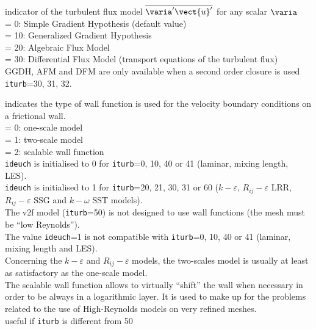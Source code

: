 {indicator of the turbulent flux model $ \overline{\varia^\prime \vect{u}^\prime}$
for any scalar $\varia$\\
\hspace*{1.3cm}= 0: Simple Gradient Hypothesis (default value)\\
\hspace*{1.3cm}= 10: Generalized Gradient Hypothesis\\
\hspace*{1.3cm}= 20: Algebraic Flux Model\\
\hspace*{1.3cm}= 30: Differential Flux Model (transport equations of the turbulent flux)\\
GGDH, AFM and DFM are only available when a second order closure is used {\tt iturb}=30, 31, 32.
}

{indicates the type of wall function is used for
 the velocity boundary conditions on a frictional wall.\\
\hspace*{1.3cm}= 0: one-scale model\\
\hspace*{1.3cm}= 1: two-scale model\\
\hspace*{1.3cm}= 2: scalable wall function\\
{\tt ideuch} is initialised to 0 for {\tt iturb}=0, 10, 40 or 41
(laminar, mixing length, LES).\\
{\tt ideuch} is initialised to 1 for {\tt iturb}=20, 21, 30, 31 or 60
($k-\varepsilon$, $R_{ij}-\varepsilon$ LRR, $R_{ij}-\varepsilon$ SSG and
$k-\omega$ SST models).\\
The v2f model ({\tt iturb}=50) is not designed to use wall functions
(the mesh must be ``low Reynolds'').\\
The value {\tt ideuch}=1 is not compatible with {\tt iturb}=0, 10, 40
or 41 (laminar, mixing length and LES).\\
Concerning the $k-\varepsilon$ and $R_{ij}-\varepsilon$ models, the
two-scales model is usually at least as satisfactory as the one-scale
model.\\
The scalable wall function allows to virtually ``shift'' the wall when
necessary in order to be always in a logarithmic layer.
It is used to make up for
the problems related to the use of High-Reynolds models on very refined
meshes.\\
useful if {\tt iturb} is different from 50}

